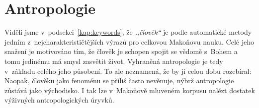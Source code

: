 



\section{Antropologie}

Viděli jsme v~podsekci~\ref{kap:keywords}, že \textit{,,člověk``} je podle
automatické metody jedním z~nejcharakterističtějších výrazů pro celkovou
Makoňovu nauku. Celé jeho snažení je motivováno tím, že člověk je schopen spojit
se vědomě s~Bohem a tomu jedinému má smysl zasvětit život. Vyhraněná
antropologie je tedy v~základu celého jeho působení. To ale neznamená, že by ji
celou dobu rozebíral: Naopak, člověku jako fenoménu se příliš často nevěnuje,
nýbrž antropologie zůstává jako východisko. I tak lze v~Makoňově mluveném
korpusu nalézt dostatek výživných antropologických úryvků.

